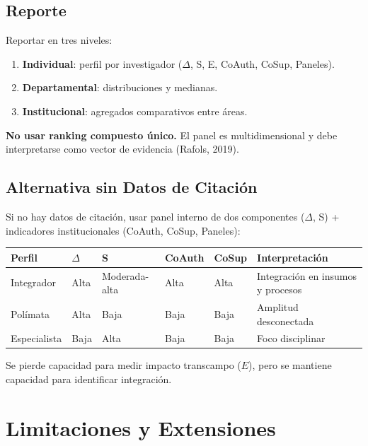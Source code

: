 \documentclass[
]{article}
\providecommand{\tightlist}{%
  \setlength{\itemsep}{0pt}\setlength{\parskip}{0pt}}
\begin{document}
\hypertarget{reporte}{%
\subsection{Reporte}\label{reporte}}

Reportar en tres niveles:

\begin{enumerate}
\def\labelenumi{\arabic{enumi}.}
\tightlist
\item
  \textbf{Individual}: perfil por investigador (\(\Delta\), S, E,
  CoAuth, CoSup, Paneles).
\item
  \textbf{Departamental}: distribuciones y medianas.
\item
  \textbf{Institucional}: agregados comparativos entre áreas.
\end{enumerate}

\textbf{No usar ranking compuesto único.} El panel es multidimensional y
debe interpretarse como vector de evidencia (Rafols, 2019).

\hypertarget{alternativa-sin-datos-de-citaciuxf3n}{%
\subsection{Alternativa sin Datos de
Citación}\label{alternativa-sin-datos-de-citaciuxf3n}}

Si no hay datos de citación, usar panel interno de dos componentes
(\(\Delta\), S) + indicadores institucionales (CoAuth, CoSup, Paneles):

\begin{longtable}[]{@{}llllll@{}}
\toprule
Perfil & \(\Delta\) & S & CoAuth & CoSup & Interpretación \\
\midrule
\endhead
Integrador & Alta & Moderada-alta & Alta & Alta & Integración en insumos
y procesos \\
Polímata & Alta & Baja & Baja & Baja & Amplitud desconectada \\
Especialista & Baja & Alta & Baja & Baja & Foco disciplinar \\
\bottomrule
\end{longtable}

Se pierde capacidad para medir impacto transcampo (\(E\)), pero se
mantiene capacidad para identificar integración.

\hypertarget{limitaciones-y-extensiones}{%
\section{Limitaciones y Extensiones}\label{limitaciones-y-extensiones}}
\end{document}
